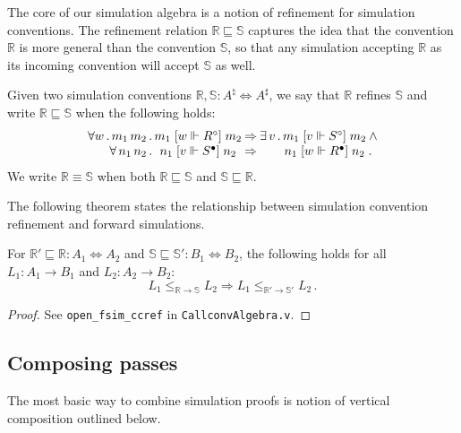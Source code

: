 \documentclass[sigplan,10pt,review,anonymous]{acmart}\settopmatter{printfolios=true,printccs=false,printacmref=false}
\newcommand{\ifr}[1]{\mathrel{[{#1}]}}
\newcommand{\que}{\circ}
\newcommand{\ans}{\bullet}
\begin{document}
The core of our simulation algebra is
a notion of refinement for simulation conventions.
The refinement relation $\mathbb{R} \sqsubseteq \mathbb{S}$
captures the idea that the convention $\mathbb{R}$
is more general than the convention $\mathbb{S}$,
so that any simulation accepting $\mathbb{R}$ as its
incoming convention will accept $\mathbb{S}$ as well.

\begin{definition} %
Given two simulation conventions
$\mathbb{R}, \mathbb{S} : A^\natural \Leftrightarrow A^\sharp$,
we say that
$\mathbb{R}$ refines $\mathbb{S}$ and write
$\mathbb{R} \sqsubseteq \mathbb{S}$
when the following holds:
\[
    \begin{array}{r@{}c@{\:\Rightarrow\:}c@{}c@{}l}
      \forall w \,.\, m_1 \, m_2 \,.\, &
      m_1 \ifr{w \Vdash R^\que} m_2 &
      \exists \, v \,.\, &
      m_1 \ifr{v \Vdash S^\que} m_2 &
      \: \wedge \\
      \forall \, n_1 \, n_2 \,.\, &
      n_1 \ifr{v \Vdash S^\ans} n_2 &
      &
      n_1 \ifr{w \Vdash R^\ans} n_2 & \,.
    \end{array}
\]
We write $\mathbb{R} \equiv \mathbb{S}$ when both
$\mathbb{R} \sqsubseteq \mathbb{S}$ and
$\mathbb{S} \sqsubseteq \mathbb{R}$.
\end{definition}

The following theorem states the relationship between
simulation convention refinement and forward simulations.

\begin{theorem} %
For
$\mathbb{R}' \sqsubseteq \mathbb{R} : A_1 \Leftrightarrow A_2$ and
$\mathbb{S} \sqsubseteq \mathbb{S}' : B_1 \Leftrightarrow B_2$,
the following holds for all
$L_1 : A_1 \rightarrow B_1$ and $L_2 : A_2 \rightarrow B_2$:
\[
      L_1 \le_{\mathbb{R} \rightarrow \mathbb{S}} L_2 \Rightarrow
      L_1 \le_{\mathbb{R}' \rightarrow \mathbb{S}'} L_2 \,.
\]
\begin{proof}
See \texttt{open\_fsim\_ccref} in \texttt{CallconvAlgebra.v}.
\end{proof}
\end{theorem}


\subsection{Composing passes} %

The most basic way to combine simulation proofs
is notion of vertical composition outlined below.
\end{document}
